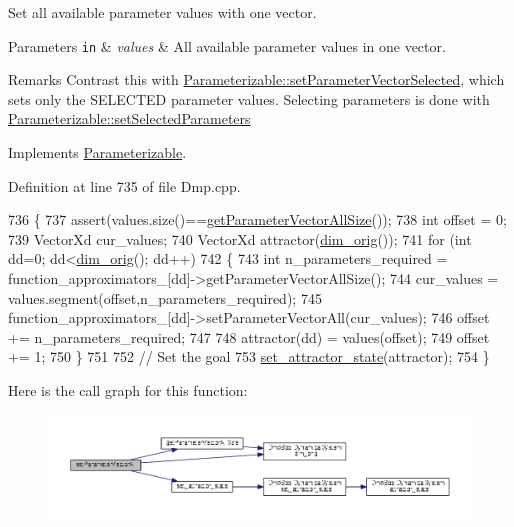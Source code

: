 Set all available parameter values with one vector. 


\begin{DoxyParams}[1]{Parameters}
\mbox{\tt in}  & {\em values} & All available parameter values in one vector. \\
\hline
\end{DoxyParams}
\begin{DoxyRemark}{Remarks}
Contrast this with \hyperlink{classDmpBbo_1_1Parameterizable_aee501e63a46d63eb58a6f271bf093b9d}{Parameterizable\+::set\+Parameter\+Vector\+Selected}, which sets only the S\+E\+L\+E\+C\+T\+E\+D parameter values. Selecting parameters is done with \hyperlink{classDmpBbo_1_1Parameterizable_a8a976b5db2d1809ece10e431816f0f27}{Parameterizable\+::set\+Selected\+Parameters} 
\end{DoxyRemark}


Implements \hyperlink{classDmpBbo_1_1Parameterizable_acef2ee975b497baf60b1f38da2b65f0d}{Parameterizable}.



Definition at line 735 of file Dmp.\+cpp.


\begin{DoxyCode}
736 \{
737   assert(values.size()==\hyperlink{classDmpBbo_1_1Dmp_ab24d2485b3b795b516f4844f225100eb}{getParameterVectorAllSize}());
738   \textcolor{keywordtype}{int} offset = 0;
739   VectorXd cur\_values;
740   VectorXd attractor(\hyperlink{group__DynamicalSystems_ga93d7cbbf2e471b00f124e41706405a05}{dim\_orig}());
741   \textcolor{keywordflow}{for} (\textcolor{keywordtype}{int} dd=0; dd<\hyperlink{group__DynamicalSystems_ga93d7cbbf2e471b00f124e41706405a05}{dim\_orig}(); dd++)
742   \{
743     \textcolor{keywordtype}{int} n\_parameters\_required = function\_approximators\_[dd]->getParameterVectorAllSize();
744     cur\_values = values.segment(offset,n\_parameters\_required);
745     function\_approximators\_[dd]->setParameterVectorAll(cur\_values);
746     offset += n\_parameters\_required;
747     
748     attractor(dd) = values(offset);
749     offset += 1;
750   \}
751   
752   \textcolor{comment}{// Set the goal}
753   \hyperlink{classDmpBbo_1_1Dmp_a6dccbd077acfd148f528a48a72a4003f}{set\_attractor\_state}(attractor); 
754 \}
\end{DoxyCode}


Here is the call graph for this function\+:
\nopagebreak
\begin{figure}[H]
\begin{center}
\leavevmode
\includegraphics[width=350pt]{classDmpBbo_1_1Dmp_a9d3c8f22e8237a805af4935a647e5a50_cgraph}
\end{center}
\end{figure}


